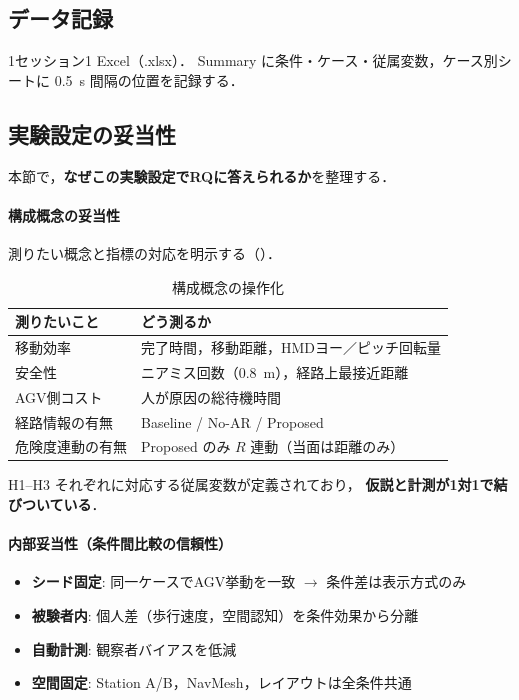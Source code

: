 \subsection{データ記録}

1セッション1 Excel（.xlsx）．
Summary に条件・ケース・従属変数，ケース別シートに \SI{0.5}{s} 間隔の位置を記録する．

\subsection{実験設定の妥当性}

本節で，\textbf{なぜこの実験設定でRQに答えられるか}を整理する．

\paragraph{構成概念の妥当性}
測りたい概念と指標の対応を明示する（）．

\begin{table}[htbp]
  \centering
  \caption{構成概念の操作化}
  \label{tab:construct}
  \begin{tabular}{ll}
    \toprule
    測りたいこと & どう測るか \\
    \midrule
    移動効率 & 完了時間，移動距離，HMDヨー／ピッチ回転量 \\
    安全性 & ニアミス回数（\SI{0.8}{m}），経路上最接近距離 \\
    AGV側コスト & 人が原因の総待機時間 \\
    経路情報の有無 & Baseline / No-AR / Proposed \\
    危険度連動の有無 & Proposed のみ $R$ 連動（当面は距離のみ） \\
    \bottomrule
  \end{tabular}
\end{table}

H1--H3 それぞれに対応する従属変数が定義されており，
\textbf{仮説と計測が1対1で結びついている}．

\paragraph{内部妥当性（条件間比較の信頼性）}

\begin{itemize}[leftmargin=2em]
  \item \textbf{シード固定}: 同一ケースでAGV挙動を一致 $\rightarrow$ 条件差は表示方式のみ
  \item \textbf{被験者内}: 個人差（歩行速度，空間認知）を条件効果から分離
  \item \textbf{自動計測}: 観察者バイアスを低減
  \item \textbf{空間固定}: Station A/B，NavMesh，レイアウトは全条件共通
\end{itemize}

